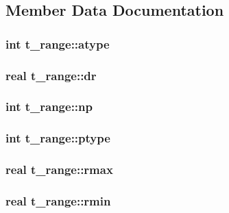 \subsection{\-Member \-Data \-Documentation}
\hypertarget{structt__range_a7cc1b17de72e8072f62be57f9a387603}{
\subsubsection[{atype}]{\setlength{\rightskip}{0pt plus 5cm}int {\bf t\-\_\-range\-::atype}}}\label{structt__range_a7cc1b17de72e8072f62be57f9a387603}
\hypertarget{structt__range_a0283c09c998e2c5911493cafdad2ced4}{
\subsubsection[{dr}]{\setlength{\rightskip}{0pt plus 5cm}real {\bf t\-\_\-range\-::dr}}}\label{structt__range_a0283c09c998e2c5911493cafdad2ced4}
\hypertarget{structt__range_a56023430c93da3ae70a7864249502bea}{
\subsubsection[{np}]{\setlength{\rightskip}{0pt plus 5cm}int {\bf t\-\_\-range\-::np}}}\label{structt__range_a56023430c93da3ae70a7864249502bea}
\hypertarget{structt__range_aaf96fe867f530225822c065d30dee823}{
\subsubsection[{ptype}]{\setlength{\rightskip}{0pt plus 5cm}int {\bf t\-\_\-range\-::ptype}}}\label{structt__range_aaf96fe867f530225822c065d30dee823}
\hypertarget{structt__range_ab6934f287bde92940fea33d8a4c64f80}{
\subsubsection[{rmax}]{\setlength{\rightskip}{0pt plus 5cm}real {\bf t\-\_\-range\-::rmax}}}\label{structt__range_ab6934f287bde92940fea33d8a4c64f80}
\hypertarget{structt__range_a2366bd0a3838d1e98eb7902b6fa729ab}{
\subsubsection[{rmin}]{\setlength{\rightskip}{0pt plus 5cm}real {\bf t\-\_\-range\-::rmin}}}\label{structt__range_a2366bd0a3838d1e98eb7902b6fa729ab}
